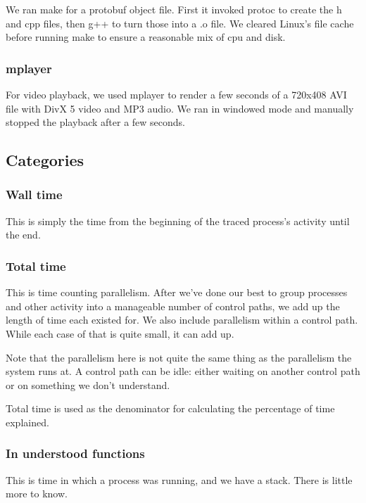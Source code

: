 \documentclass[10pt]{article}
\begin{document}
We ran make for a protobuf object file.\cite{pb}  First it invoked protoc to create the h and cpp files, then g++ to turn those into a .o file.  We cleared Linux's file cache before running make to ensure a reasonable mix of cpu and disk.

\subsubsection{mplayer}

For video playback, we used mplayer to render a few seconds of a 720x408 AVI file with DivX 5 video and MP3 audio.  We ran in windowed mode and manually stopped the playback after a few seconds.

\subsection{Categories}

\subsubsection{Wall time}

This is simply the time from the beginning of the traced process's activity until the end.

\subsubsection{Total time}

This is time counting parallelism.  After we've done our best to group processes and other activity into a manageable number of control paths, we add up the length of time each existed for.  We also include parallelism within a control path.  While each case of that is quite small, it can add up.

Note that the parallelism here is not quite the same thing as the parallelism the system runs at.  A control path can be idle: either waiting on another control path or on something we don't understand.

Total time is used as the denominator for calculating the percentage of time explained.

\subsubsection{In understood functions}

This is time in which a process was running, and we have a stack.  There is little more to know.
\end{document}

